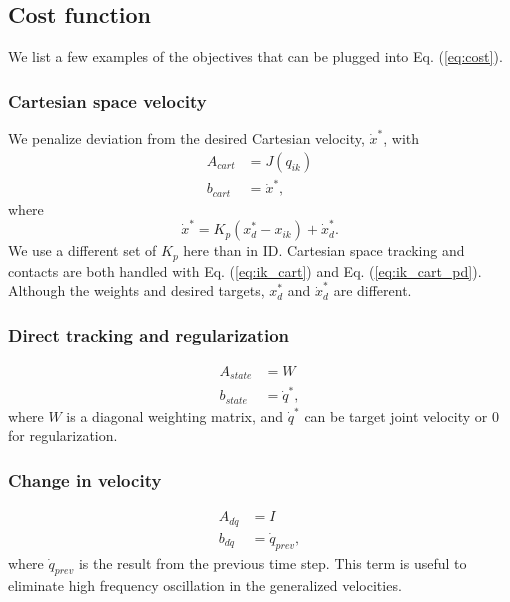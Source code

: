 \documentclass{ws-ijhr}
\newcommand{\eref}[1] {Eq. (\ref{#1})}
\begin{document}
\subsection{Cost function}
We list a few examples of the objectives that can be plugged into 
\eref{eq:cost}. 
\subsubsection{Cartesian space velocity} 
We penalize deviation from the desired Cartesian velocity, $\dot{x}^*$, with 
\begin{equation}
  \begin{split}
    A_{cart} &= J(q_{ik}) \\
    b_{cart} &= \dot{x}^*,
  \label{eq:ik_cart}
  \end{split}
\end{equation}
where 
\begin{equation}
  \dot{x}^* = K_p(x^*_d - x_{ik}) + \dot{x}^*_d.
  \label{eq:ik_cart_pd}
\end{equation}
We use a different set of $K_p$ here than in ID. 
Cartesian space tracking and contacts are both handled with 
\eref{eq:ik_cart} and \eref{eq:ik_cart_pd}. Although the weights and desired 
targets, $x^*_d$ and $\dot{x}^*_d$ are different.

\subsubsection{Direct tracking and regularization} 
\begin{equation}
  \begin{split}
    A_{state} &= W \\
    b_{state} &= \dot{q}^*,
  \end{split}
	\label{eq:ik_reg}
\end{equation} 
where $W$ is a diagonal weighting matrix, 
and $\dot{q}^*$ can be target joint velocity or 0 for regularization.

\subsubsection{Change in velocity} 
\begin{equation}
  \begin{split}
    A_{d\dot{q}} &= I \\
    b_{d\dot{q}} &= \dot{q}_{prev},
  \end{split}
\end{equation} 
where $\dot{q}_{prev}$ is the result from the previous time step. This 
term is useful to eliminate high frequency oscillation in the generalized 
velocities. 
\end{document}
